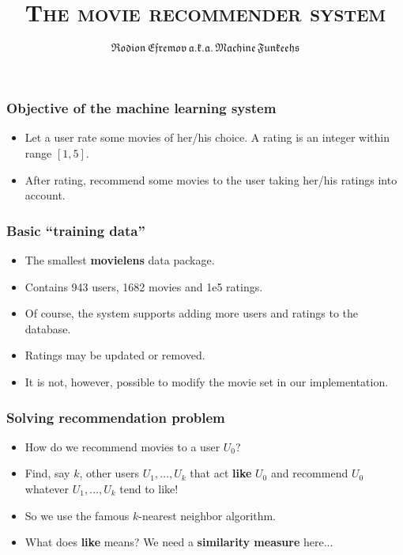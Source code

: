 \documentclass{beamer}
\title{{\rmfamily\scshape The movie recommender system}}
\author{$\mathfrak{Rodion \, Efremov \, a.k.a. \, Machine \, Funkeehs}$}
\date{}
\institute{Project in Practical Machine Learning, spring 2015, Department of Computer Science, University of Helsinki}
\begin{document}
\maketitle

\begin{frame}
  \frametitle{Objective of the machine learning system}
  \pause
  \begin{itemize}
   \item Let a user rate some movies of her/his choice. A rating is an integer within range $[1, 5]$.
   \pause
   \item After rating, recommend some movies to the user taking her/his ratings into account.
  \end{itemize}
\end{frame}

\begin{frame}
  \frametitle{Basic ``training data''}
  \pause
  \begin{itemize}
  \item The smallest \textbf{movielens} data package.
  \pause
  \item Contains 943 users, 1682 movies and 1e5 ratings.
  \pause
  \item Of course, the system supports adding more users and ratings to the database.
  \pause
  \item Ratings may be updated or removed.
  \pause
  \item It is not, however, possible to modify the movie set in our implementation.
  \end{itemize}
\end{frame}

\begin{frame}
  \frametitle{Solving recommendation problem}
  \pause
  \begin{itemize}
  \item How do we recommend movies to a user $U_0$?
  \pause
  \item Find, say $k$, other users $U_1, \dots, U_k$ that act \textbf{like} $U_0$ and recommend $U_0$ whatever $U_1, \dots, U_k$ tend to like!
  \pause
  \item So we use the famous $k$-nearest neighbor algorithm.
  \pause 
  \item What does \textbf{like} means? We need a \textbf{similarity measure} here...
  \end{itemize}
\end{frame}
\end{document}
